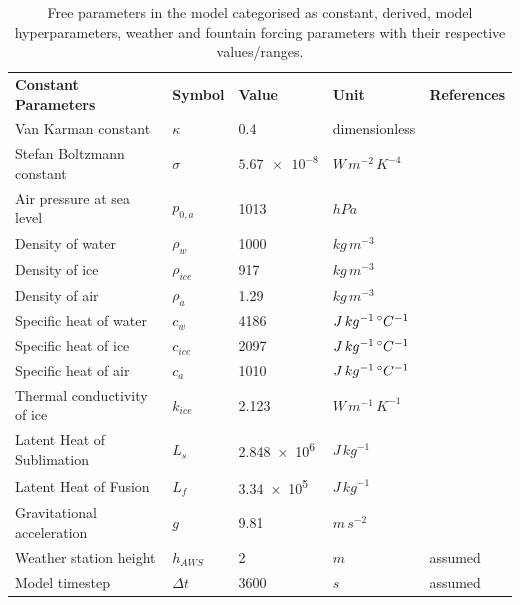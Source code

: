 \documentclass[utf8]{frontiersSCNS}
\begin{document}
\begin{table}
  \caption{Free parameters in the model categorised as constant, derived, model hyperparameters, weather and
  fountain forcing parameters with their respective values/ranges.}

	\label{tab:parameters}
	\begin{tabular}{lllll}
		\toprule
		\textbf{Constant Parameters}                       & \textbf{Symbol} & \textbf{Value} &
    \textbf{Unit} & \textbf{References} \\
    Van Karman constant & $\kappa$      & 0.4        &dimensionless & \citeauthor{CuffeyPaterson_2010}              \\
    Stefan Boltzmann constant & $\sigma$ & $\num{5.67 e-8} $& $W\, m^{-2}\, K^{-4}$ & \citeauthor{CuffeyPaterson_2010}\\
    Air pressure at sea level & $p_{0,a}$ & 1013 & $hPa$  & \citeauthor{MolgHardy_2004}\\
    Density of water & $\rho_{w}$ & 1000 & $kg\, m^{-3}$    & \citeauthor{CuffeyPaterson_2010}\\
    Density of ice & $\rho_{ice}$ & 917 & $kg\, m^{-3}$ & \citeauthor{CuffeyPaterson_2010}\\
    Density of air & $\rho_{a}$ &  1.29 & $kg\, m^{-3}$   & \citeauthor{MolgHardy_2004}\\
    Specific heat of water & $c_{w}$ & 4186 & $J\, kg^{-1}\,\degree C^{-1}$  & \citeauthor{CuffeyPaterson_2010}\\
    Specific heat of ice & $c_{ice}$ & 2097 & $J\, kg^{-1}\,\degree C^{-1}$ & \citeauthor{CuffeyPaterson_2010}\\
    Specific heat of air & $c_{a}$ & 1010 & $J\, kg^{-1}\,\degree C^{-1}$ & \citeauthor{MolgHardy_2004}\\
    Thermal conductivity of ice & $k_{ice}$ & 2.123  & $W\, m^{-1}\, K^{-1}$ & \citeauthor{Bonales_2017} \\
    Latent Heat of Sublimation & $L_{s}$ & \num{2.848e6}  & $J\, kg^{-1}$ &   \citeauthor{CuffeyPaterson_2010}\\
    Latent Heat of Fusion & $L_{f}$ & \num{3.34e5} & $J\, kg^{-1}$ & \citeauthor{CuffeyPaterson_2010}\\
    Gravitational acceleration & $g$ & 9.81 & $m\, s^{-2}$ &\citeauthor{CuffeyPaterson_2010}\\
    Weather station height & $h_{AWS}$ & 2 & $m$ & assumed \\
    Model timestep                            & $\Delta t$            & $3600$           & $s$ & assumed \\

\end{tabular}
\end{table}
\end{document}
